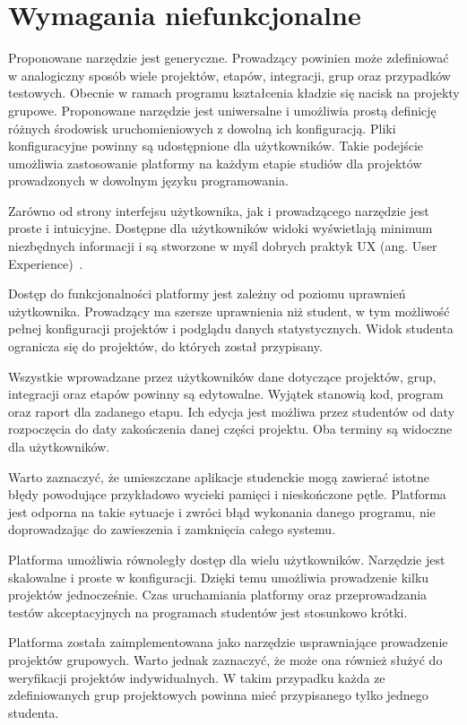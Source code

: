 \section{Wymagania niefunkcjonalne}

Proponowane narzędzie jest generyczne.
Prowadzący powinien może zdefiniować w analogiczny sposób wiele projektów, etapów, integracji, grup oraz przypadków testowych.
Obecnie w ramach programu kształcenia kładzie się nacisk na projekty grupowe.
Proponowane narzędzie jest uniwersalne i umożliwia prostą definicję różnych środowisk uruchomieniowych z dowolną ich konfiguracją.
Pliki konfiguracyjne powinny są udostępnione dla użytkowników.
Takie podejście umożliwia zastosowanie platformy na każdym etapie studiów dla projektów prowadzonych w dowolnym języku programowania.

Zarówno od strony interfejsu użytkownika, jak i prowadzącego narzędzie jest proste i intuicyjne.
Dostępne dla użytkowników widoki wyświetlają minimum niezbędnych informacji i są stworzone w myśl dobrych praktyk UX (ang. User Experience)~\cite{ux-good-practicies}.

Dostęp do funkcjonalności platformy jest zależny od poziomu uprawnień użytkownika.
Prowadzący ma szersze uprawnienia niż student, w tym możliwość pełnej konfiguracji projektów i podglądu danych statystycznych.
Widok studenta ogranicza się do projektów, do których został przypisany.

Wszystkie wprowadzane przez użytkowników dane dotyczące projektów, grup, integracji oraz etapów powinny są edytowalne.
Wyjątek stanowią kod, program oraz raport dla zadanego etapu.
Ich edycja jest możliwa przez studentów od daty rozpoczęcia do daty zakończenia danej części projektu.
Oba terminy są widoczne dla użytkowników.

Warto zaznaczyć, że umieszczane aplikacje studenckie mogą zawierać istotne błędy powodujące przykładowo wycieki pamięci i nieskończone pętle.
Platforma jest odporna na takie sytuacje i zwróci błąd wykonania danego programu, nie doprowadzając do zawieszenia i zamknięcia całego systemu.

Platforma umożliwia równoległy dostęp dla wielu użytkowników.
Narzędzie jest skalowalne i proste w konfiguracji.
Dzięki temu umożliwia prowadzenie kilku projektów jednocześnie.
Czas uruchamiania platformy oraz przeprowadzania testów akceptacyjnych na programach studentów jest stosunkowo krótki.

Platforma została zaimplementowana jako narzędzie usprawniające prowadzenie projektów grupowych.
Warto jednak zaznaczyć, że może ona również służyć do weryfikacji projektów indywidualnych.
W takim przypadku każda ze zdefiniowanych grup projektowych powinna mieć przypisanego tylko jednego studenta.


